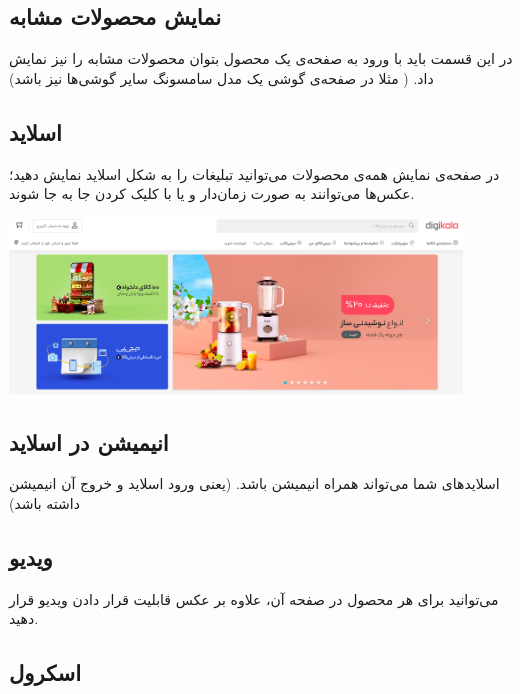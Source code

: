 \documentclass[]{article}
\begin{document}
\newpage

\subsection*{{\titr نمایش محصولات مشابه   }}

در این قسمت باید با ورود به صفحه‌ی یک محصول بتوان محصولات مشابه را نیز نمایش داد. ( مثلا در صفحه‌ی گوشی یک مدل سامسونگ سایر گوشی‌ها نیز باشد)

\subsection*{{\titr اسلاید   }}

در صفحه‌ی نمایش همه‌ی محصولات می‌توانید تبلیغات را به شکل اسلاید نمایش دهید؛ عکس‌ها می‌توانند به صورت زمان‌دار و یا با کلیک کردن جا به جا شوند. 

 \begin{center}
\includegraphics[width=0.9\textwidth]{images/image34.png}
\end{center}

\subsection*{{\titr انیمیشن در اسلاید   }}


اسلاید‌های  شما می‌تواند همراه انیمیشن باشد. (یعنی ورود اسلاید و خروج آن انیمیشن داشته باشد)
 
 
\subsection*{{\titr ویدیو  }}


می‌توانید برای هر محصول در صفحه آن، علاوه بر عکس قابلیت قرار دادن ویدیو قرار دهید.


\subsection*{{\titr اسکرول  }}
\end{document}
